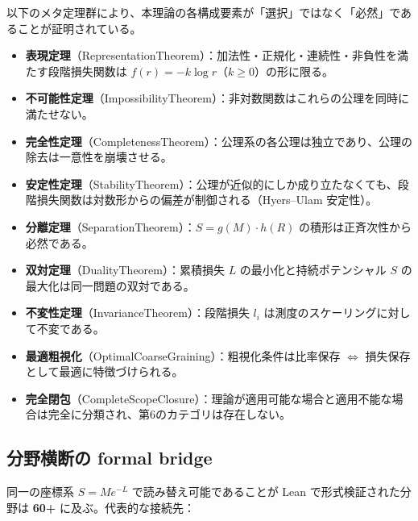 \documentclass[12pt,a4paper]{article}
\begin{document}
以下のメタ定理群により、本理論の各構成要素が「選択」ではなく「必然」であることが証明されている。

\begin{itemize}
\tightlist
\item
  \textbf{表現定理}（RepresentationTheorem）：加法性・正規化・連続性・非負性を満たす段階損失関数は \(f(r) = -k \log r\)（\(k \geq 0\)）の形に限る。
\item
  \textbf{不可能性定理}（ImpossibilityTheorem）：非対数関数はこれらの公理を同時に満たせない。
\item
  \textbf{完全性定理}（CompletenessTheorem）：公理系の各公理は独立であり、公理の除去は一意性を崩壊させる。
\item
  \textbf{安定性定理}（StabilityTheorem）：公理が近似的にしか成り立たなくても、段階損失関数は対数形からの偏差が制御される（Hyers--Ulam 安定性）。
\item
  \textbf{分離定理}（SeparationTheorem）：\(S = g(M) \cdot h(R)\) の積形は正斉次性から必然である。
\item
  \textbf{双対定理}（DualityTheorem）：累積損失 \(L\) の最小化と持続ポテンシャル \(S\) の最大化は同一問題の双対である。
\item
  \textbf{不変性定理}（InvarianceTheorem）：段階損失 \(l_i\) は測度のスケーリングに対して不変である。
\item
  \textbf{最適粗視化}（OptimalCoarseGraining）：粗視化条件は比率保存 \(\Leftrightarrow\) 損失保存として最適に特徴づけられる。
\item
  \textbf{完全閉包}（CompleteScopeClosure）：理論が適用可能な場合と適用不能な場合は完全に分類され、第6のカテゴリは存在しない。
\end{itemize}

\subsection{分野横断の formal bridge}\label{ux5206ux91ceux6a2aux65adux306e-formal-bridge}

同一の座標系 \(S = Me^{-L}\) で読み替え可能であることが Lean で形式検証された分野は \textbf{60+} に及ぶ。代表的な接続先：
\end{document}
